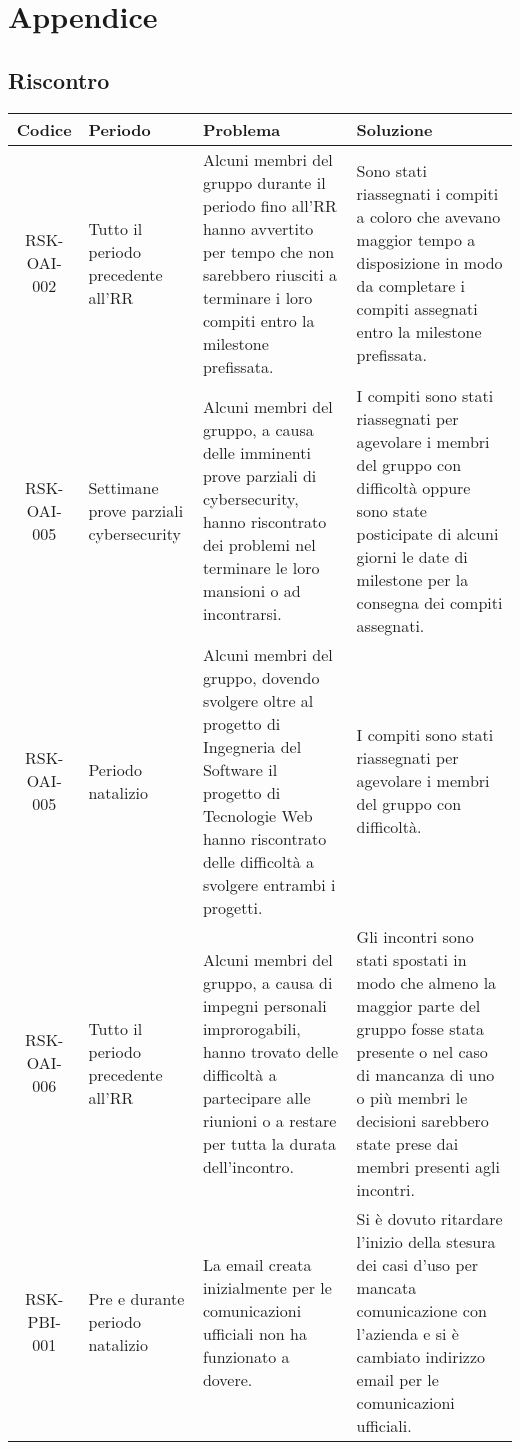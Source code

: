 \section{Appendice}

	\subsection{Riscontro}

		\begin{center}
			\begin{longtable}{|c|p{3cm}|p{4cm}|p{4cm}|}
			\hline
			\rowcolor{lighter-grayer}
			\textbf{Codice} & \textbf{Periodo} & \textbf{Problema} & \textbf{Soluzione} \\
			\hline
			\endfirsthead

			\hline
			RSK-OAI-002 & Tutto il periodo precedente all'RR & Alcuni membri del gruppo durante il periodo fino all'RR hanno avvertito per tempo che non sarebbero riusciti a terminare i loro compiti entro la milestone prefissata. & Sono stati riassegnati i compiti a coloro che avevano maggior tempo a disposizione in modo da completare i compiti assegnati entro la milestone prefissata. \\
			\hline
			\hline
			RSK-OAI-005 & Settimane prove parziali cybersecurity & Alcuni membri del gruppo, a causa delle imminenti prove parziali di cybersecurity, hanno riscontrato dei problemi nel terminare le loro mansioni o ad incontrarsi. & I compiti sono stati riassegnati per agevolare i membri del gruppo con difficoltà oppure sono state posticipate di alcuni giorni le date di milestone per la consegna dei compiti assegnati.  \\
			\hline
			\hline
			RSK-OAI-005 & Periodo natalizio & Alcuni membri del gruppo, dovendo svolgere oltre al progetto di Ingegneria del Software il progetto di Tecnologie Web hanno riscontrato delle difficoltà a svolgere entrambi i progetti. & I compiti sono stati riassegnati per agevolare i membri del gruppo con difficoltà.  \\
			\hline
			\hline
			RSK-OAI-006 & Tutto il periodo precedente all'RR & Alcuni membri del gruppo, a causa di impegni personali improrogabili, hanno trovato delle difficoltà a partecipare alle riunioni o a restare per tutta la durata dell'incontro. & Gli incontri sono stati spostati in modo che almeno la maggior parte del gruppo fosse stata presente o nel caso di mancanza di uno o più membri le decisioni sarebbero state prese dai membri presenti agli incontri. \\
			\hline
			\hline
			RSK-PBI-001 & Pre e durante periodo natalizio & La email creata inizialmente per le comunicazioni ufficiali non ha funzionato a dovere. & Si è dovuto ritardare l'inizio della stesura dei casi d'uso per mancata comunicazione con l'azienda e si è cambiato indirizzo email per le comunicazioni ufficiali. \\
			\hline

			\end{longtable}
		\end{center}

